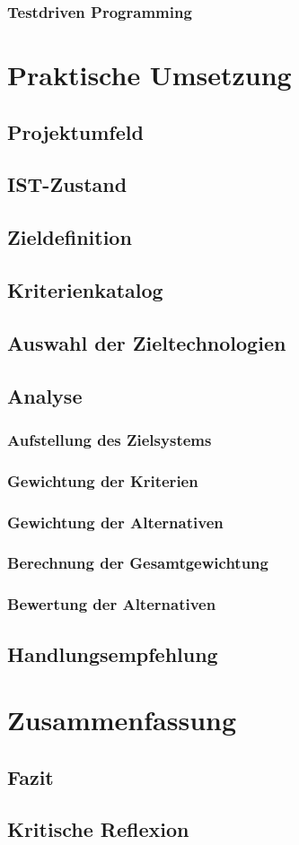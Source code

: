 \subsection{Testdriven Programming}  
\chapter{Praktische Umsetzung}
\section{Projektumfeld}
\section{IST-Zustand}
\section{Zieldefinition}
\section{Kriterienkatalog}
\section{Auswahl der Zieltechnologien}
\section{Analyse}
\subsection{Aufstellung des Zielsystems}
\subsection{Gewichtung der Kriterien}
\subsection{Gewichtung der Alternativen}
\subsection{Berechnung der Gesamtgewichtung}
\subsection{Bewertung der Alternativen}
\section{Handlungsempfehlung}
\chapter{Zusammenfassung}
\section{Fazit} 
\section{Kritische Reflexion}
